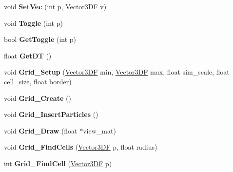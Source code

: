 \begin{DoxyCompactItemize}
\item 
\hypertarget{class_point_set_a9666c3e245d71182dfb78323b43764a4}{void {\bfseries Set\+Vec} (int p, \hyperlink{class_vector3_d_f}{Vector3\+D\+F} v)}\label{class_point_set_a9666c3e245d71182dfb78323b43764a4}

\item 
\hypertarget{class_point_set_ab45c961a81e7be9ed969fd01d831f519}{void {\bfseries Toggle} (int p)}\label{class_point_set_ab45c961a81e7be9ed969fd01d831f519}

\item 
\hypertarget{class_point_set_a5ee560894966634fe9f6424aeb178123}{bool {\bfseries Get\+Toggle} (int p)}\label{class_point_set_a5ee560894966634fe9f6424aeb178123}

\item 
\hypertarget{class_point_set_a028037c412f8a02b22a648b21bc9e829}{float {\bfseries Get\+D\+T} ()}\label{class_point_set_a028037c412f8a02b22a648b21bc9e829}

\item 
\hypertarget{class_point_set_a408b2106311f746a983557513d5ba5da}{void {\bfseries Grid\+\_\+\+Setup} (\hyperlink{class_vector3_d_f}{Vector3\+D\+F} min, \hyperlink{class_vector3_d_f}{Vector3\+D\+F} max, float sim\+\_\+scale, float cell\+\_\+size, float border)}\label{class_point_set_a408b2106311f746a983557513d5ba5da}

\item 
\hypertarget{class_point_set_a2118df50295cd40f14ae56b55855110e}{void {\bfseries Grid\+\_\+\+Create} ()}\label{class_point_set_a2118df50295cd40f14ae56b55855110e}

\item 
\hypertarget{class_point_set_a032c5d3a5e64f6eb6462dcfded951d7b}{void {\bfseries Grid\+\_\+\+Insert\+Particles} ()}\label{class_point_set_a032c5d3a5e64f6eb6462dcfded951d7b}

\item 
\hypertarget{class_point_set_a066b9b503d026f155cacb99c8e8d11bd}{void {\bfseries Grid\+\_\+\+Draw} (float $\ast$view\+\_\+mat)}\label{class_point_set_a066b9b503d026f155cacb99c8e8d11bd}

\item 
\hypertarget{class_point_set_a484da2831752ec2f1a56c9adde88bbcb}{void {\bfseries Grid\+\_\+\+Find\+Cells} (\hyperlink{class_vector3_d_f}{Vector3\+D\+F} p, float radius)}\label{class_point_set_a484da2831752ec2f1a56c9adde88bbcb}

\item 
\hypertarget{class_point_set_a822e46b94907d30ac9706163b518ec49}{int {\bfseries Grid\+\_\+\+Find\+Cell} (\hyperlink{class_vector3_d_f}{Vector3\+D\+F} p)}\label{class_point_set_a822e46b94907d30ac9706163b518ec49}


\end{DoxyCompactItemize}
